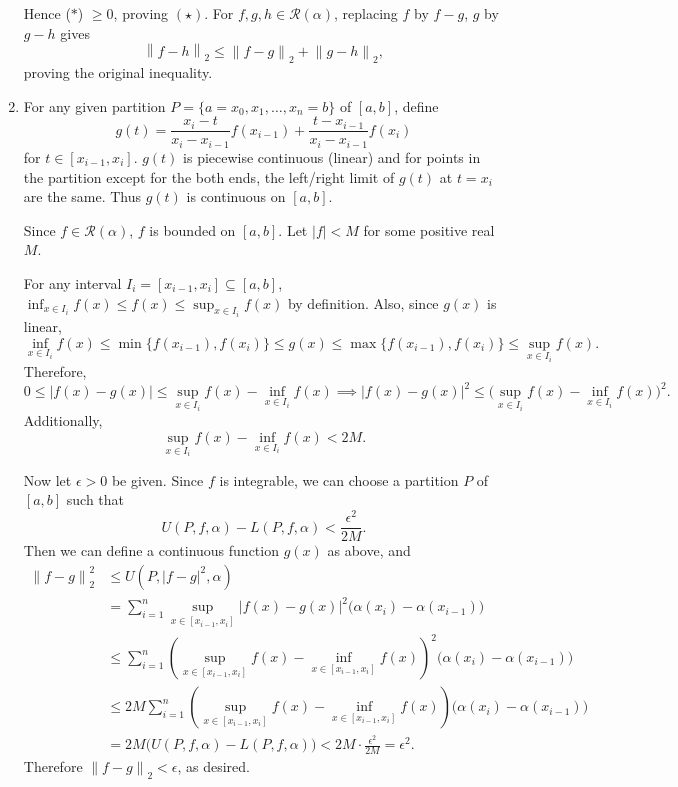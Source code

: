 \documentclass[12pt]{report}
\newcommand{\numl}[1]{\item[\large\textbf{\sffamily #1.}]}
\newcommand{\ds}{\displaystyle}
\newcommand{\mc}[1]{\mathcal{#1}}
\renewcommand{\subset}{\subseteq}
\newcommand{\norm}[1]{\left\lVert #1 \right\rVert}
\newcommand{\abs}[1]{\left| #1 \right|}
\newcommand{\mast}{\(\ast\)}
\begin{document}
\begin{enumerate}
    \medskip

    Hence (\mast) \(\geq 0\), proving \((\star)\). For \(f, g, h \in \mc{R}(\alpha)\), replacing \(f\) by \(f - g\), \(g\) by \(g - h\) gives
    \[
        \norm{f - h}_2 \leq \norm{f-g}_2 + \norm{g-h}_2,
    \]
    proving the original inequality.

    \pagebreak

    \numl{6} For any given partition \(P = \{a = x_0, x_1, \dots, x_n = b\}\) of \([a, b]\), define
    \[
        g(t) = \frac{x_i - t}{x_i - x_{i-1}} f(x_{i-1}) + \frac{t - x_{i-1}}{x_i - x_{i-1}} f(x_i)
    \]
    for \(t \in [x_{i-1}, x_i]\). \(g(t)\) is piecewise continuous (linear) and for points in the partition except for the both ends, the left/right limit of \(g(t)\) at \(t = x_i\) are the same. Thus \(g(t)\) is continuous on \([a, b]\).

    Since \(f \in \mc{R}(\alpha)\), \(f\) is bounded on \([a, b]\). Let \(\abs{f} < M\) for some positive real \(M\).

    For any interval \(I_i = [x_{i-1}, x_i] \subset [a, b]\), \(\ds \inf_{x \in I_i} f(x) \leq f(x) \leq \sup_{x \in I_i} f(x)\) by definition. Also, since \(g(x)\) is linear,
    \[
        \inf_{x \in I_i} f(x) \leq \min\{f(x_{i-1}), f(x_i)\} \leq g(x) \leq \max\{f(x_{i-1}), f(x_i)\} \leq \sup_{x \in I_i} f(x).
    \] Therefore,
    \[
        0 \leq \abs{f(x) - g(x)} \leq \sup_{x\in I_i} f(x) - \inf_{x\in I_i}f(x) \implies \abs{f(x) - g(x)}^2 \leq \bigl(\sup_{x\in I_i} f(x) - \inf_{x\in I_i}f(x)\bigr)^2.
    \]
    Additionally,
    \[
        \sup_{x\in I_i} f(x) - \inf_{x\in I_i}f(x) < 2M.
    \]

    Now let \(\epsilon > 0\) be given. Since \(f\) is integrable, we can choose a partition \(P\) of \([a, b]\) such that
    \[
        U(P, f, \alpha) - L(P, f, \alpha) < \frac{\epsilon^2}{2M}.
    \]
    Then we can define a continuous function \(g(x)\) as above, and
    \[
        \begin{aligned}
            \norm{f-g}_2^2 & \leq U(P, \abs{f-g}^2, \alpha)                                                                                                                   \\
                           & = \sum_{i=1}^n \sup_{x \in [x_{i-1}, x_i]} \abs{f(x) - g(x)}^2 \bigl(\alpha(x_i) - \alpha(x_{i-1})\bigr)                                         \\
                           & \leq \sum_{i=1}^n \left(\sup_{x \in [x_{i-1}, x_i]} f(x) - \inf_{x \in [x_{i-1}, x_i]} f(x) \right)^2 \bigl(\alpha(x_i) - \alpha(x_{i-1})\bigr)  \\
                           & \leq 2M \sum_{i=1}^n \left(\sup_{x \in [x_{i-1}, x_i]} f(x) - \inf_{x \in [x_{i-1}, x_i]} f(x) \right) \bigl(\alpha(x_i) - \alpha(x_{i-1})\bigr) \\
                           & = 2M\big(U(P, f, \alpha) - L(P, f, \alpha)\big) < 2M \cdot \frac{\epsilon^2}{2M} = \epsilon^2.
        \end{aligned}
    \]
    Therefore \(\norm{f-g}_2 < \epsilon\), as desired.
\end{enumerate}
\end{document}

